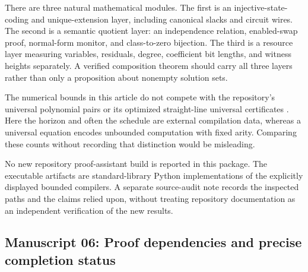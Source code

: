 \documentclass[11pt,a4paper]{article}
\theoremstyle{definition}
\theoremstyle{remark}
\begin{document}
There are three natural mathematical modules. The first is an injective-state-coding and unique-extension layer, including canonical slacks and circuit wires. The second is a semantic quotient layer: an independence relation, enabled-swap proof, normal-form monitor, and class-to-zero bijection. The third is a resource layer measuring variables, residuals, degree, coefficient bit lengths, and witness heights separately. A verified composition theorem should carry all three layers rather than only a proposition about nonempty solution sets.

The numerical bounds in this article do not compete with the repository's universal polynomial pairs or its optimized straight-line universal certificates \cite{repo-h10}. Here the horizon and often the schedule are external compilation data, whereas a universal equation encodes unbounded computation with fixed arity. Comparing these counts without recording that distinction would be misleading.

No new repository proof-assistant build is reported in this package. The executable artifacts are standard-library Python implementations of the explicitly displayed bounded compilers. A separate source-audit note records the inspected paths and the claims relied upon, without treating repository documentation as an independent verification of the new results.


\subsection{Manuscript 06: Proof dependencies and precise completion status}
\label{cdc:cs:app:status}
\end{document}
